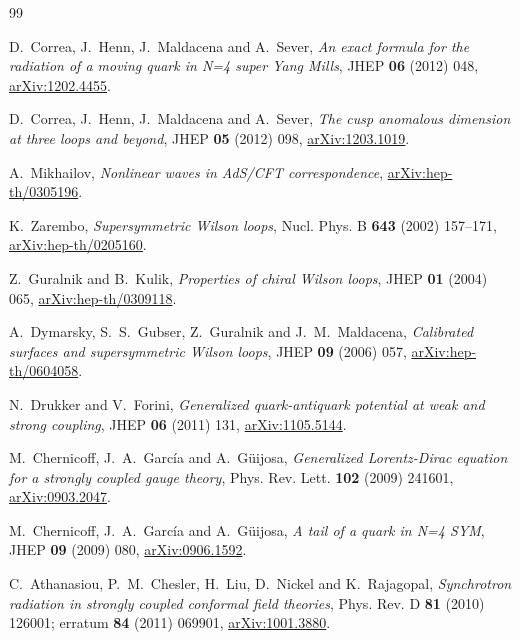 \begin{thebibliography}{99}

D.~Correa, J.~Henn, J.~Maldacena and A.~Sever,
\emph{An exact formula for the radiation of a moving quark in N=4 super Yang Mills},
JHEP \textbf{06} (2012) 048,
\href{https://arxiv.org/abs/1202.4455}{arXiv:1202.4455}.

D.~Correa, J.~Henn, J.~Maldacena and A.~Sever,
\emph{The cusp anomalous dimension at three loops and beyond},
JHEP \textbf{05} (2012) 098,
\href{https://arxiv.org/abs/1203.1019}{arXiv:1203.1019}.

A.~Mikhailov,
\emph{Nonlinear waves in AdS/CFT correspondence},
\href{https://arxiv.org/abs/hep-th/0305196}{arXiv:hep-th/0305196}.

K.~Zarembo,
\emph{Supersymmetric Wilson loops},
Nucl. Phys. B \textbf{643} (2002) 157--171,
\href{https://arxiv.org/abs/hep-th/0205160}{arXiv:hep-th/0205160}.

Z.~Guralnik and B.~Kulik,
\emph{Properties of chiral Wilson loops},
JHEP \textbf{01} (2004) 065,
\href{https://arxiv.org/abs/hep-th/0309118}{arXiv:hep-th/0309118}.

A.~Dymarsky, S.~S.~Gubser, Z.~Guralnik and J.~M.~Maldacena,
\emph{Calibrated surfaces and supersymmetric Wilson loops},
JHEP \textbf{09} (2006) 057,
\href{https://arxiv.org/abs/hep-th/0604058}{arXiv:hep-th/0604058}.

N.~Drukker and V.~Forini,
\emph{Generalized quark-antiquark potential at weak and strong coupling},
JHEP \textbf{06} (2011) 131,
\href{https://arxiv.org/abs/1105.5144}{arXiv:1105.5144}.

M.~Chernicoff, J.~A.~Garc\'ia and A.~G\"uijosa,
\emph{Generalized Lorentz-Dirac equation for a strongly coupled gauge theory},
Phys. Rev. Lett. \textbf{102} (2009) 241601,
\href{https://arxiv.org/abs/0903.2047}{arXiv:0903.2047}.

M.~Chernicoff, J.~A.~Garc\'ia and A.~G\"uijosa,
\emph{A tail of a quark in N=4 SYM},
JHEP \textbf{09} (2009) 080,
\href{https://arxiv.org/abs/0906.1592}{arXiv:0906.1592}.

C.~Athanasiou, P.~M.~Chesler, H.~Liu, D.~Nickel and K.~Rajagopal,
\emph{Synchrotron radiation in strongly coupled conformal field theories},
Phys. Rev. D \textbf{81} (2010) 126001; erratum \textbf{84} (2011) 069901,
\href{https://arxiv.org/abs/1001.3880}{arXiv:1001.3880}.


\end{thebibliography}
